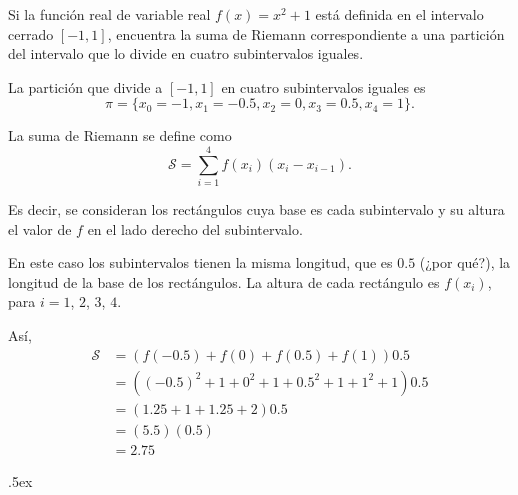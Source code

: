 \documentclass[12pt,letterpaper]{article}
\author{\textsc{Manuel López Mateos}}
\newcommand{\fej}{\relax\hfill\ifmmode{\lower.5ex\hbox{{\textcolor{blue}{\LARGE\smiley al 15pt}}}}\else\lower.5ex\hbox{{\textcolor{blue}{\LARGE \smiley}}}}  %
\begin{document}
\noindent Si la función real de variable real $f(x)=x^2+1$ está definida en el intervalo cerrado $[-1,1]$, encuentra la suma de Riemann correspondiente a una partición del intervalo que lo divide en cuatro subintervalos iguales.

La partición que divide a $[-1,1]$ en cuatro subintervalos iguales es $$\pi=\{x_0=-1, x_1=-0.5, x_2=0, x_3=0.5, x_4=1\}.$$

La suma de Riemann se define como 
$$\mathcal S=\sum_{i=1}^4f(x_i)(x_i-x_{i-1}).$$

Es decir, se consideran los rectángulos cuya base es cada subintervalo y su altura el valor de $f$ en el lado derecho del subintervalo.

En este caso los subintervalos tienen la misma longitud, que es $0.5$ (¿por qué?), la longitud de la base de los rectángulos. La altura de cada rectángulo es $f(x_i)$, para $i=1$, $2$, $3$, $4$.

Así,
\begin{align*}
\mathcal S&=\left(f(-0.5)+f(0)+f(0.5)+f(1)\right)0.5\\
&=\left((-0.5)^2+1+0^2+1+0.5^2+1+1^2+1\right)0.5\\
&=(1.25+1+1.25+2)0.5\\
&=(5.5)(0.5)\\
&=2.75
\end{align*}

\fej
\end{document}
